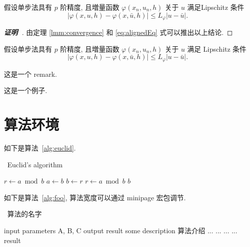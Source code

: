 \begin{theorem}\label{thm:convergence}
假设单步法具有 $p$ 阶精度, 且増量函数 $\varphi(x_{n}, u_{n}, h)$ 关于 $u$ 满足\textup{Lipschitz} 条件
\begin{equation}\label{eq:conver2}
|\varphi(x, u, h)-\varphi(x, \bar{u}, h)| \leqslant L_{\varphi}|u-\bar{u}|.
\end{equation}
\end{theorem}
\begin{proof}[\normalfont\bfseries 证明~\nopunct]
由定理 \ref{lmm:convergence} 和 \eqref{eq:alignedEq} 式可以推出以上结论.
\end{proof}

\begin{corollary}\label{col:convergence}
假设单步法具有 $p$ 阶精度, 且増量函数 $\varphi(x_{n}, u_{n}, h)$ 关于 $u$ 满足 \textup{Lipschitz} 条件
\begin{equation}\label{eq:conver3}
|\varphi(x, u, h)-\varphi(x, \bar{u}, h)| \leqslant L_{\varphi}|u-\bar{u}|.
\end{equation}
\end{corollary}

\begin{remark}\label{rem:remark}
这是一个 remark.
\end{remark}

\begin{example}
这是一个例子.
\end{example}


\clearpage
\section{算法环境}

如下是算法~\ref{alg:euclid}.
\begin{algorithm}[H]
\small
\caption{~Euclid's algorithm}\label{alg:euclid}
\begin{algorithmic}[1]
  \State $r\gets a\bmod b$
  \State $a\gets b$
  \State $b\gets r$
  \State $r\gets a\bmod b$
  \EndWhile\label{euclidendwhile}
  \State \Return $b$
  \EndProcedure
\end{algorithmic}
\end{algorithm}


如下是算法~\ref{alg:foo}, 算法宽度可以通过 minipage 宏包调节.
\begin{center}
\vspace{-2ex}
\begin{minipage}{.9\linewidth}
\begin{algorithm}[H]
\caption{~算法的名字}\label{alg:foo}
\begin{algorithmic}[1]
\Require input parameters A, B, C
\Ensure output result
\State some description 算法介绍
  \State ...
    \State ...
    \Else
    \State ...
  \EndIf
\EndFor
{}
  \State ...
\EndWhile
\State \Return result
\end{algorithmic}
\end{algorithm}
\end{minipage}
\end{center}


